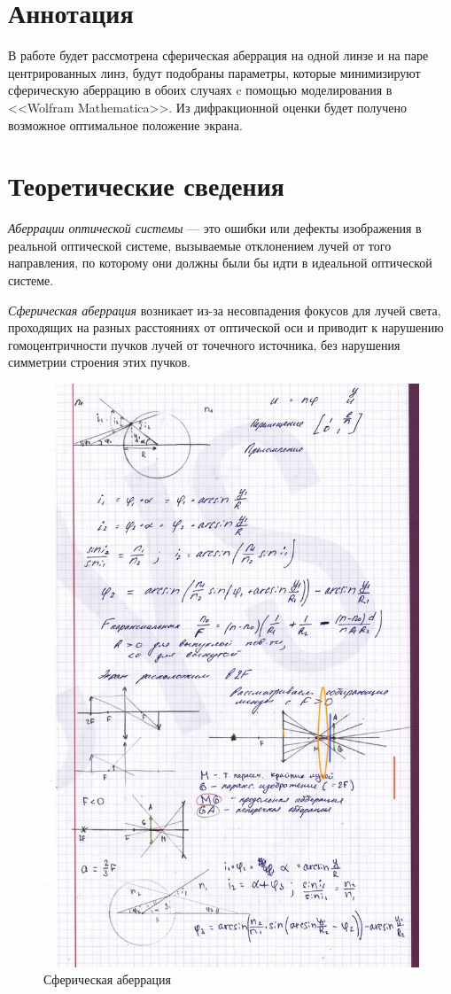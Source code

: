 \documentclass[a4paper, 12pt]{article}
\begin{document}

\section{Аннотация}
В работе будет рассмотрена сферическая аберрация на одной линзе и на
паре центрированных линз, будут подобраны параметры, которые минимизируют сферическую
аберрацию в обоих случаях c помощью моделирования в <<Wolfram
Mathematica>>. Из дифракционной оценки будет получено возможное оптимальное
положение экрана.

\section{Теоретические сведения}
\textit{Аберрации оптической системы} --- это ошибки или дефекты
изображения в реальной оптической системе, вызываемые отклонением
лучей от того направления, по которому они должны были бы идти в
идеальной оптической системе.

\textit{Сферическая аберрация}  возникает из-за несовпадения фокусов
для лучей света, проходящих на разных расстояниях от оптической оси и
приводит к нарушению гомоцентричности пучков лучей от точечного
источника, без нарушения симметрии строения этих пучков.

%    

\begin{figure}[H]
    \includegraphics[width=0.6\linewidth]{1} 
    \caption{Сферическая аберрация}
    \label{fig:1}
\end{figure}
\end{document}
